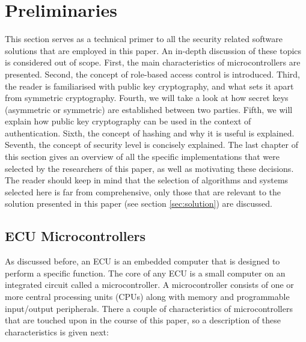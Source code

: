 \chapter{Preliminaries}
\label{chap:preliminaries}

This section serves as a technical primer to all the security related software solutions that are employed in this paper. An in-depth discussion of these topics is considered out of scope. First, the main characteristics of microcontrollers are presented. Second, the concept of role-based access control is introduced. Third, the reader is familiarised with public key cryptography, and what sets it apart from symmetric cryptography. Fourth, we will take a look at how secret keys (asymmetric or symmetric) are established between two parties. Fifth, we will explain how public key cryptography can be used in the context of authentication. Sixth, the concept of hashing and why it is useful is explained. Seventh, the concept of security level is concisely explained. The last chapter of this section gives an overview of all the specific implementations that were selected by the researchers of this paper, as well as motivating these decisions. The reader should keep in mind that the selection of algorithms and systems selected here is far from comprehensive, only those that are relevant to the solution presented in this paper (see section \ref{sec:solution}) are discussed. 

\section{ECU Microcontrollers}
\label{sec:microcontrollers}

As discussed before, an ECU is an embedded computer that is designed to perform a specific function. The core of any ECU is a small computer on an integrated circuit called a microcontroller. A microcontroller consists of one or more central processing units (CPUs)  along with memory and programmable input/output peripherals. There a couple of characteristics of microcontrollers that are touched upon in the course of this paper, so a description of these characteristics is given next:

